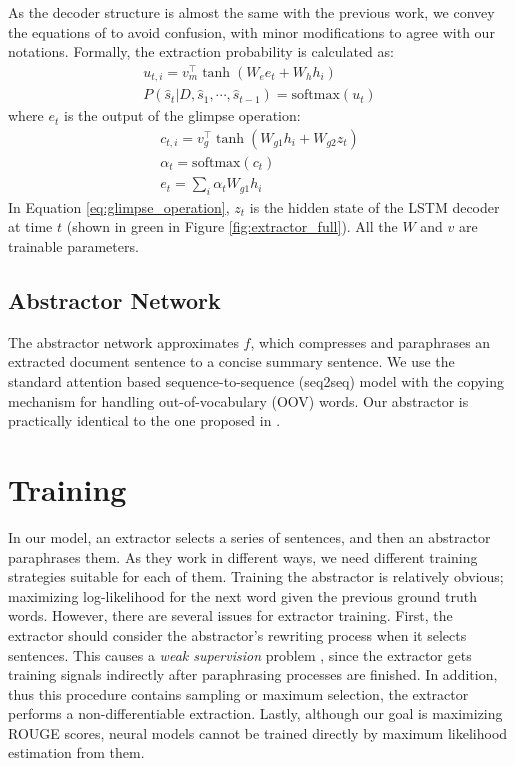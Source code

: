 \documentclass[11pt,a4paper]{article}
\begin{document}
As the decoder structure is almost the same with the previous work,
we convey the equations of \citet{chen-bansal-2018-fast}
to avoid confusion, with minor modifications to agree with our notations.
Formally, the extraction probability is calculated as:
\begin{gather}
\label{eq:extractor_score}
u_{t,i} = v_m^\top\tanh(W_ee_t + W_hh_i) \\
P(\hat{s}_t|D,\hat{s}_1,\cdots,\hat{s}_{t-1})=\mathrm{softmax}(u_t)
\end{gather}
where $e_t$ is the output of the glimpse operation:
\begin{gather}
\label{eq:glimpse_operation}
c_{t,i}=v_g^\top\tanh(W_{g1}h_i+W_{g2}z_t) \\
\alpha_t=\mathrm{softmax}(c_t) \\
e_t=\sum_i\alpha_tW_{g1}h_i
\end{gather}
In Equation \ref{eq:glimpse_operation}, $z_t$ is the hidden state
of the LSTM decoder at time $t$ (shown in green in Figure \ref{fig:extractor_full}).
All the $W$ and $v$ are trainable parameters.

\subsection{Abstractor Network}
The abstractor network approximates $f$, which compresses
and paraphrases an extracted document sentence to a concise
summary sentence. We use the standard attention based
sequence-to-sequence (seq2seq) model \cite{BahdanauCB14, luong-etal-2015-effective}
with the copying mechanism \cite{see-etal-2017-get}
for handling out-of-vocabulary (OOV) words.
Our abstractor is practically identical to the one
proposed in \citet{chen-bansal-2018-fast}.

\section{Training} \label{Training}

In our model, an extractor selects a series of sentences, and then an abstractor paraphrases them. As they work in different ways,
we need different training strategies suitable for each of them. Training the abstractor
is relatively obvious; maximizing log-likelihood for the next word
given the previous ground truth words. However, there are several
issues for extractor training. First, the extractor should consider
the abstractor's rewriting process when it selects sentences.
This causes a \emph{weak supervision} problem \cite{jehl-etal-2019-neural},
since the extractor gets training signals indirectly
after paraphrasing processes are finished.
In addition, thus this procedure contains sampling or maximum selection,
the extractor performs a non-differentiable extraction.
Lastly, although our goal is maximizing ROUGE scores,
neural models cannot be trained directly by maximum likelihood estimation from them.
\end{document}
